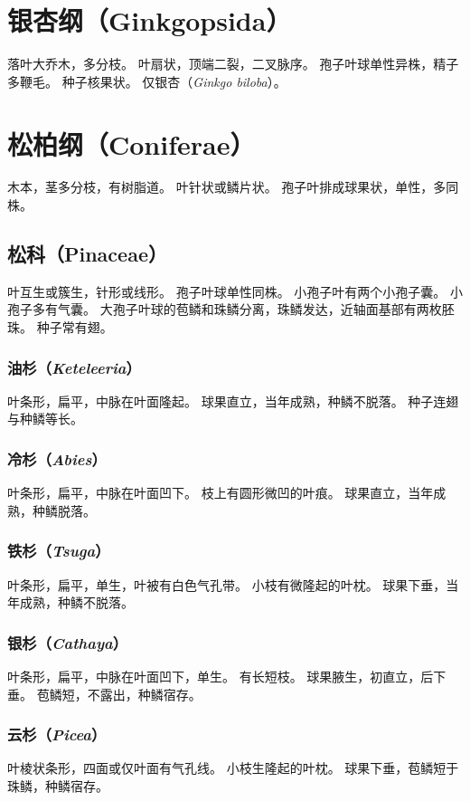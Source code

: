 \documentclass[11pt]{article}
\begin{document}
\begin{sloppypar}
\section{银杏纲（Ginkgopsida）}
落叶大乔木，多分枝。
叶扇状，顶端二裂，二叉脉序。
孢子叶球单性异株，精子多鞭毛。
种子核果状。
仅银杏（\textit{Ginkgo biloba}）。

\section{松柏纲（Coniferae）}
木本，茎多分枝，有树脂道。
叶针状或鳞片状。
孢子叶排成球果状，单性，多同株。

\subsection{松科（Pinaceae）}
叶互生或簇生，针形或线形。
孢子叶球单性同株。
小孢子叶有两个小孢子囊。
小孢子多有气囊。
大孢子叶球的苞鳞和珠鳞分离，珠鳞发达，近轴面基部有两枚胚珠。
种子常有翅。

\subsubsection{油杉（\textit{Keteleeria}）}
叶条形，扁平，中脉在叶面隆起。
球果直立，当年成熟，种鳞不脱落。
种子连翅与种鳞等长。

\subsubsection{冷杉（\textit{Abies}）}
叶条形，扁平，中脉在叶面凹下。
枝上有圆形微凹的叶痕。
球果直立，当年成熟，种鳞脱落。

\subsubsection{铁杉（\textit{Tsuga}）}
叶条形，扁平，单生，叶被有白色气孔带。
小枝有微隆起的叶枕。
球果下垂，当年成熟，种鳞不脱落。

\subsubsection{银杉（\textit{Cathaya}）}
叶条形，扁平，中脉在叶面凹下，单生。
有长短枝。
球果腋生，初直立，后下垂。
苞鳞短，不露出，种鳞宿存。

\subsubsection{云杉（\textit{Picea}）}
叶棱状条形，四面或仅叶面有气孔线。
小枝生隆起的叶枕。
球果下垂，苞鳞短于珠鳞，种鳞宿存。


\end{sloppypar}
\end{document}
